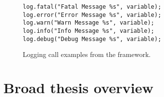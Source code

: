 \begin{figure}[H]
\vspace*{1em}
\begin{center}
\begin{minipage}{4in}
\begin{lstlisting}[frame=single,numbers=none]
log.fatal("Fatal Message %s", variable);
log.error("Error Message %s", variable);
log.warn("Warn Message %s", variable);
log.info("Info Message %s", variable);
log.debug("Debug Message %s", variable);
\end{lstlisting}
\end{minipage}
\caption{Logging call examples from the  framework.\label{fig:chap1_logCode}\label{fig:log-call-examples}}
\end{center}
\end{figure}

%
%
%



\section{Broad thesis overview} \label{intro-overview}

